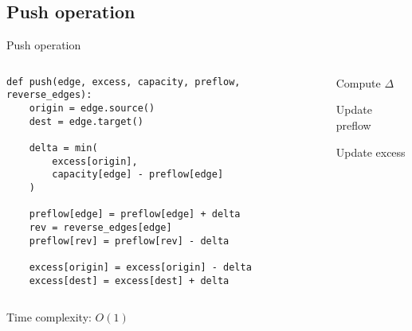 \documentclass{beamer}
\begin{document}
\subsection{Push operation}
\begin{frame}[fragile]{Push operation}
    \begin{columns}[T]
        \begin{column}{0.50\textwidth}
            \begin{lstlisting}
def push(edge, excess, capacity, preflow, reverse_edges):
    origin = edge.source()
    dest = edge.target()

    delta = min(
        excess[origin],
        capacity[edge] - preflow[edge]
    )

    preflow[edge] = preflow[edge] + delta
    rev = reverse_edges[edge]
    preflow[rev] = preflow[rev] - delta

    excess[origin] = excess[origin] - delta
    excess[dest] = excess[dest] + delta
            \end{lstlisting}
        \end{column}

        \begin{column}{0.50\textwidth}
            \begin{sidecomment}
                \pause
                \vskip 38bp
                Compute $\Delta$

                \pause
                \vskip 22bp
                Update preflow

                \pause
                \vskip 14bp
                Update excess
            \end{sidecomment}
        \end{column}
    \end{columns}

    \pause
    \vspace*{\fill}
    Time complexity: $O(1)$
\end{frame}
\end{document}
